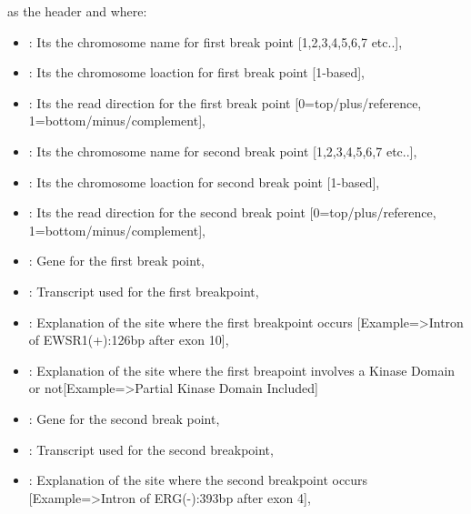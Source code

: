 \documentclass[letterpaper,10pt,english]{sphinxmanual}
\begin{document}
as the header and where:
\begin{itemize}
\item {} 
 : Its the chromosome name for first break point {[}1,2,3,4,5,6,7 etc..{]},

\item {} 
 : Its the chromosome loaction for first break point {[}1-based{]},

\item {} 
 : Its the read direction for the first break point {[}0=top/plus/reference, 1=bottom/minus/complement{]},

\item {} 
 : Its the chromosome name for second break point {[}1,2,3,4,5,6,7 etc..{]},

\item {} 
 : Its the chromosome loaction for second break point {[}1-based{]},

\item {} 
 : Its the read direction for the second break point {[}0=top/plus/reference, 1=bottom/minus/complement{]},

\item {} 
 : Gene for the first break point,

\item {} 
 : Transcript used for the first breakpoint,

\item {} 
 : Explanation of the site where the first breakpoint occurs {[}Example=\textgreater{}Intron of EWSR1(+):126bp after exon 10{]},

\item {} 
 : Explanation of the site where the first breapoint involves a Kinase Domain or not{[}Example=\textgreater{}Partial Kinase Domain Included{]}

\item {} 
 : Gene for the second break point,

\item {} 
 : Transcript used for the second breakpoint,

\item {} 
 : Explanation of the site where the second breakpoint occurs {[}Example=\textgreater{}Intron of ERG(-):393bp after exon 4{]},


\end{itemize}
\end{document}
